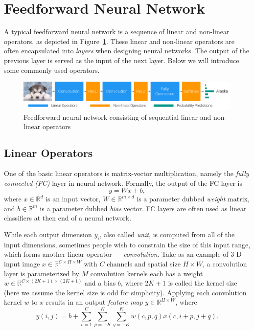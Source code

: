 \section{Feedforward Neural Network} %
\label{sec:dl-feedforward}
A typical feedforward neural network is a sequence of linear and non-linear operators, as depicted in Figure~\ref{fig:dl-feedforward}. These linear and non-linear operators are often encapsulated into \emph{layers} when designing neural networks. The output of the previous layer is served as the input of the next layer. Below we will introduce some commonly used operators.
\begin{figure}[t]
\begin{center}
\includegraphics[width=1.0\linewidth]{figures/feedforward.pdf}
\caption{Feedforward neural network consisting of sequential linear and non-linear operators}
\label{fig:dl-feedforward}
\end{center}
\end{figure}

\subsection{Linear Operators} %
\label{sub:dl-linops}
One of the basic linear operators is matrix-vector multiplication, namely the \emph{fully connected (FC)} layer in neural network. Formally, the output of the FC layer is
\begin{equation}
  y=Wx+b,
\end{equation}
where $x\in\mathbb{R}^d$ is an input vector, $W\in\mathbb{R}^{m\times d}$ is a parameter dubbed \emph{weight} matrix, and $b\in\mathbb{R}^m$ is a parameter dubbed \emph{bias} vector. FC layers are often used as linear classifiers at then end of a neural network.

While each output dimension $y_i$, also called \emph{unit}, is computed from all of the input dimensions, sometimes people wish to constrain the size of this input range, which forms another linear operator --- \emph{convolution}. Take as an example of 3-D input image $x\in\mathbb{R}^{C\times H\times W}$ with $C$ channels and spatial size $H\times W$, a convolution layer is parameterized by $M$ convolution kernels each has a weight $w\in\mathbb{R}^{C\times (2K+1)\times (2K+1)}$ and a bias $b$, where $2K+1$ is called the kernel size (here we assume the kernel size is odd for simplicity). Applying each convolution kernel $w$ to $x$ results in an output \emph{feature map} $y\in\mathbb{R}^{H\times W}$, where
\begin{equation}
  y(i,j) = b + \sum_{c=1}^C \sum_{p=-K}^K \sum_{q=-K}^K w(c,p,q) x(c,i+p,j+q).
\end{equation}

